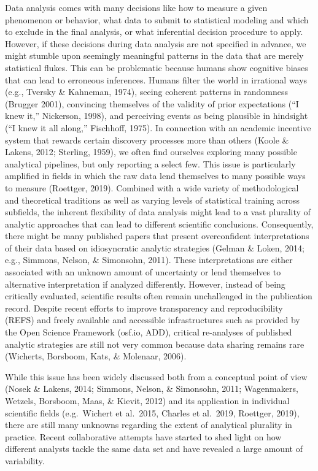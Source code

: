 \documentclass[
  english,
  man,floatsintext]{apa6}
\begin{document}
Data analysis comes with many decisions like how to measure a given phenomenon or behavior, what data to submit to statistical modeling and which to exclude in the final analysis, or what inferential decision procedure to apply.
However, if these decisions during data analysis are not specified in advance, we might stumble upon seemingly meaningful patterns in the data that are merely statistical flukes.
This can be problematic because humans show cognitive biases that can lead to erroneous inferences.
Humans filter the world in irrational ways (e.g., Tversky \& Kahneman, 1974), seeing coherent patterns in randomness (Brugger 2001), convincing themselves of the validity of prior expectations ({``I knew it,''} Nickerson, 1998), and perceiving events as being plausible in hindsight ({``I knew it all along,''} Fischhoff, 1975).
In connection with an academic incentive system that rewards certain discovery processes more than others (Koole \& Lakens, 2012; Sterling, 1959), we often find ourselves exploring many possible analytical pipelines, but only reporting a select few.
This issue is particularly amplified in fields in which the raw data lend themselves to many possible ways to measure (Roettger, 2019).
Combined with a wide variety of methodological and theoretical traditions as well as varying levels of statistical training across subfields, the inherent flexibility of data analysis might lead to a vast plurality of analytic approaches that can lead to different scientific conclusions.
Consequently, there might be many published papers that present overconfident interpretations of their data based on idiosyncratic analytic strategies (Gelman \& Loken, 2014; e.g., Simmons, Nelson, \& Simonsohn, 2011).
These interpretations are either associated with an unknown amount of uncertainty or lend themselves to alternative interpretation if analyzed differently.
However, instead of being critically evaluated, scientific results often remain unchallenged in the publication record.
Despite recent efforts to improve transparency and reproducibility (REFS) and freely available and accessible infrastructures such as provided by the Open Science Framework (osf.io, ADD), critical re-analyses of published analytic strategies are still not very common because data sharing remains rare (Wicherts, Borsboom, Kats, \& Molenaar, 2006).

While this issue has been widely discussed both from a conceptual point of view (Nosek \& Lakens, 2014; Simmons, Nelson, \& Simonsohn, 2011; Wagenmakers, Wetzels, Borsboom, Maas, \& Kievit, 2012) and its application in individual scientific fields (e.g.~Wichert et al.~2015, Charles et al.~2019, Roettger, 2019), there are still many unknowns regarding the extent of analytical plurality in practice.
Recent collaborative attempts have started to shed light on how different analysts tackle the same data set and have revealed a large amount of variability.
\end{document}
